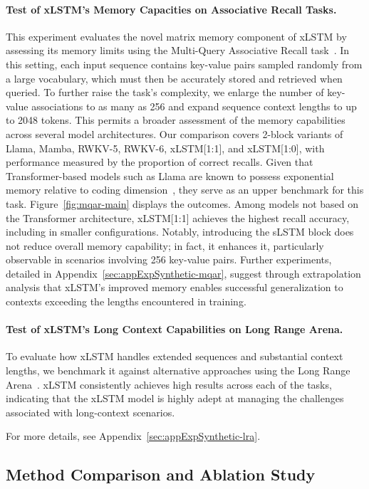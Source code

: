 \paragraph{Test of xLSTM's Memory Capacities on Associative Recall Tasks.} This experiment evaluates the novel matrix memory component of xLSTM by assessing its memory limits using the Multi-Query Associative Recall task~\citep{Arora:23arxiv}. In this setting, each input sequence contains key-value pairs sampled randomly from a large vocabulary, which must then be accurately stored and retrieved when queried. To further raise the task's complexity, we enlarge the number of key-value associations to as many as 256 and expand sequence context lengths to up to 2048 tokens. This permits a broader assessment of the memory capabilities across several model architectures. Our comparison covers 2-block variants of Llama, Mamba, RWKV-5, RWKV-6, xLSTM[1:1], and xLSTM[1:0], with performance measured by the proportion of correct recalls. Given that Transformer-based models such as Llama are known to possess exponential memory relative to coding dimension~\citep{Ramsauer:21}, they serve as an upper benchmark for this task. Figure~\ref{fig:mqar-main} displays the outcomes. 
Among models not based on the Transformer architecture, xLSTM[1:1] achieves the highest recall accuracy, including in smaller configurations. Notably, introducing the sLSTM block does not reduce overall memory capability; in fact, it enhances it, particularly observable in scenarios involving 256 key-value pairs. Further experiments, detailed in Appendix~\ref{sec:appExpSynthetic-mqar}, suggest through extrapolation analysis that xLSTM's improved memory enables successful generalization to contexts exceeding the lengths encountered in training.

\paragraph{Test of xLSTM's Long Context Capabilities on Long Range Arena.} To evaluate how xLSTM handles extended sequences and substantial context lengths, we benchmark it against alternative approaches using the Long Range Arena~\citep{Tay:21}. xLSTM consistently achieves high results across each of the tasks, indicating that the xLSTM model is highly adept at managing the challenges associated with long-context scenarios.

For more details, see Appendix~\ref{sec:appExpSynthetic-lra}.

\subsection{Method Comparison and Ablation Study}
\label{sec:ExpComparison}

